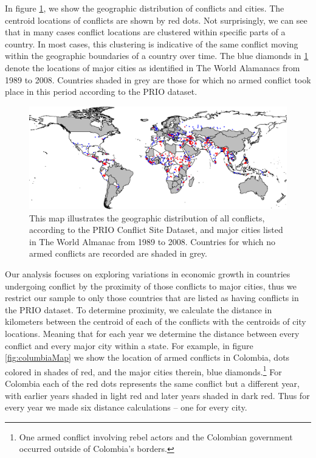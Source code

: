 In figure \ref{fig:CityConfMap}, we show the geographic distribution of conflicts and cities. The centroid locations of conflicts are shown by red dots. Not surprisingly, we can see that in many cases conflict locations are clustered within specific parts of a country. In most cases, this clustering is indicative of the same conflict moving within the geographic boundaries of a country over time. The blue diamonds in \ref{fig:CityConfMap} denote the locations of major cities as identified in The World Alamanacs from 1989 to 2008. Countries shaded in grey are those for which no armed conflict took place in this period according to the PRIO dataset.  

\begin{figure}
	\centering
	\includegraphics[width=.9\textwidth]{CityConfMap-crop}
	\caption{This map illustrates the geographic distribution of all conflicts, according to the PRIO Conflict Site Dataset, and major cities listed in The World Almanac from 1989 to 2008. Countries for which no armed conflicts are recorded are shaded in grey.}
	\label{fig:CityConfMap}
\end{figure}
\FloatBarrier

Our analysis focuses on exploring variations in economic growth in countries undergoing conflict by the proximity of those conflicts to major cities, thus we restrict our sample to only those countries that are listed as having conflicts in the PRIO dataset. To determine proximity, we calculate the distance in kilometers between the centroid of each of the conflicts with the centroids of city locations. Meaning that for each year we determine the distance between every conflict and every major city within a state. For example, in figure \ref{fig:columbiaMap} we show the location of armed conflicts in Colombia, dots colored in shades of red, and the major cities therein, blue diamonds.\footnote{One armed conflict involving rebel actors and the Colombian government occurred outside of Colombia's borders.} For Colombia each of the red dots represents the same conflict but a different year, with earlier years shaded in light red and later years shaded in dark red. Thus for every year we made six distance calculations -- one for every city.

